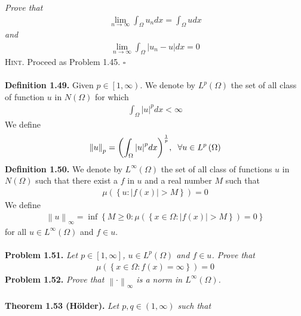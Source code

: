 \documentclass[a4paper]{article}
\numberwithin{equation}{section}
\begin{document}
\textit{Prove that}
\begin{align}
\mathop {\lim }\limits_{n \to \infty } \int_\Omega  {{u_n}dx}  = \int_\Omega  {udx} 
\end{align}
\textit{and}
\begin{align}
\mathop {\lim }\limits_{n \to \infty } \int_\Omega  {\left| {{u_n} - u} \right|dx}  = 0
\end{align}
\textsc{Hint.} Proceed as Problem 1.45. \hfill $\square$\\
\\
\textbf{Definition 1.49.} Given $p\in \left[1,\infty \right)$. We denote by $L^p\left(\Omega\right)$ the set of all class of function $u$ in $N\left(\Omega\right)$ for which
\begin{align}
\int_\Omega  {{{\left| u \right|}^p}dx}  < \infty 
\end{align}
We define
\begin{align}
{\left\| u \right\|_p} = {\left( {\int_\Omega  {{{\left| u \right|}^p}dx} } \right)^{\frac{1}{p}}},\hspace{0.2cm}\forall u \in {L^p}\left( \Omega  \right)
\end{align}
\textbf{Definition 1.50.} We denote by $L^\infty \left(\Omega\right)$ the set of all class of functions $u$ in $N\left(\Omega\right)$ such that there exist a $f$ in $u$ and a real number $M$ such that
\begin{align}
\mu \left( {\left\{ {u:\left| {f\left( x \right)} \right| > M} \right\}} \right) = 0
\end{align}
We define
\begin{align}
{\left\| u \right\|_\infty } = \inf \left\{ {M \ge 0:\mu \left( {\left\{ {x \in \Omega :\left| {f\left( x \right)} \right| > M} \right\}} \right) = 0} \right\}
\end{align}
for all $u\in L^\infty \left(\Omega\right)$ and $f\in u$.\\
\\
\textbf{Problem 1.51.} \textit{Let $p \in \left[1,\infty\right]$, $u\in L^p\left(\Omega\right)$ and $f\in u$. Prove that}
\begin{align}
\mu \left( {\left\{ {x \in \Omega :f\left( x \right) = \infty } \right\}} \right) = 0
\end{align}
\textbf{Problem 1.52.} \textit{Prove that ${\left\|  \cdot  \right\|_\infty }$ is a norm in $L^{\infty}\left(\Omega\right)$.}\\
\\
\textbf{Theorem 1.53 (H\"{o}lder).} \textit{Let $p,q\in \left(1,\infty\right)$ such that}
\end{document}
